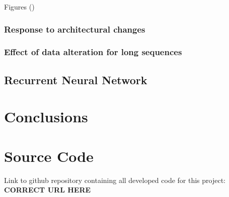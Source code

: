 \documentclass
[twocolumn,
secnumarabic,
nobibnotes,
aps,
prl,
reprint,
groupedaddress,
amsmath,
amssymb,
]{revtex4-2}
\begin{document}
Figures ()

\subsubsection{Response to architectural changes}


\subsubsection{Effect of data alteration for long sequences}


\subsection{Recurrent Neural Network}

\section{Conclusions}

\appendix

\section{Source Code}
\label{sec:sc}
Link to github repository containing all developed code for this project: \textbf{CORRECT URL HERE}%





\end{document}
